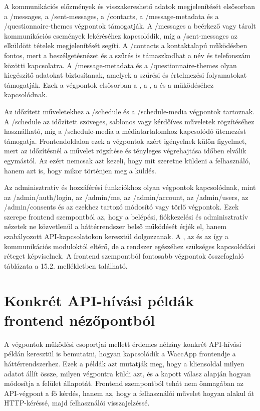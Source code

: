 A kommunikációs előzmények és visszakereshető adatok megjelenítését elsősorban a /messages, a /sent-messages, a /contacts, a /message-metadata és a /questionnaire-themes végpontok támogatják. A /messages a beérkező vagy tárolt kommunikációs események lekéréséhez kapcsolódik, míg a /sent-messages az elküldött tételek megjelenítését segíti. A /contacts a kontaktalapú működésben fontos, mert a beszélgetésnézet és a szűrés is támaszkodhat a név és telefonszám közötti kapcsolatra. A /message-metadata és a /questionnaire-themes olyan kiegészítő adatokat biztosítanak, amelyek a szűrési és értelmezési folyamatokat támogatják. Ezek a végpontok elsősorban a , a , a  és a  működéséhez kapcsolódnak. 

Az időzített műveletekhez a /schedule és a /schedule-media végpontok tartoznak. A /schedule az időzített szöveges, sablonos vagy kérdőíves műveletek rögzítéséhez használható, míg a /schedule-media a médiatartalomhoz kapcsolódó ütemezést támogatja. Frontendoldalon ezek a végpontok azért igényelnek külön figyelmet, mert az időzítésnél a művelet rögzítése és tényleges végrehajtása időben elválik egymástól. Az  ezért nemcsak azt kezeli, hogy mit szeretne küldeni a felhasználó, hanem azt is, hogy mikor történjen meg a küldés. 

Az adminisztratív és hozzáférési funkciókhoz olyan végpontok kapcsolódnak, mint az /admin/auth/login, az /admin/me, az /admin/account, az /admin/users, az /admin/consents és az ezekhez tartozó módosító vagy törlő végpontok. Ezek szerepe frontend szempontból az, hogy a belépési, fiókkezelési és adminisztratív nézetek ne közvetlenül a háttérrendszer belső működését érjék el, hanem szabályozott API-kapcsolatokon keresztül dolgozzanak. A , az  és az  így a kommunikációs moduloktól eltérő, de a rendszer egészéhez szükséges kapcsolódási réteget képviselnek.  A frontend szempontból fontosabb végpontok összefoglaló táblázata a 15.2. mellékletben található.

\section{Konkrét API-hívási példák frontend nézőpontból}

A végpontok működési csoportjai mellett érdemes néhány konkrét API-hívási példán keresztül is bemutatni, hogyan kapcsolódik a WaccApp frontendje a háttérrendszerhez. Ezek a példák azt mutatják meg, hogy a kliensoldal milyen adatot állít össze, milyen végpontra küldi azt, és a kapott válasz alapján hogyan módosítja a felület állapotát. Frontend szempontból tehát nem önmagában az API-végpont a fő kérdés, hanem az, hogy a felhasználói művelet hogyan alakul át HTTP-kéréssé, majd felhasználói visszajelzéssé.

